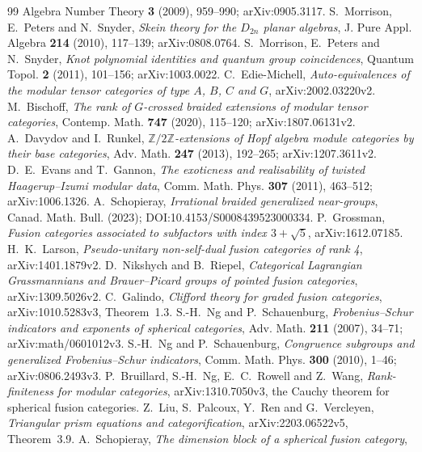\documentclass[11pt,reqno]{amsart}
\theoremstyle{definition}
\theoremstyle{remark}
\newcommand{\Z}{\mathbb Z}
\begin{document}
\begin{thebibliography}{99}
Algebra Number Theory \textbf{3} (2009), 959--990; arXiv:0905.3117.
 S.~Morrison, E.~Peters and N.~Snyder,
\emph{Skein theory for the $D_{2n}$ planar algebras},
J. Pure Appl. Algebra \textbf{214} (2010), 117--139; arXiv:0808.0764.
 S.~Morrison, E.~Peters and N.~Snyder,
\emph{Knot polynomial identities and quantum group coincidences},
Quantum Topol. \textbf{2} (2011), 101--156; arXiv:1003.0022.
 C.~Edie-Michell,
\emph{Auto-equivalences of the modular tensor categories of type
$A$, $B$, $C$ and $G$}, arXiv:2002.03220v2.
 M.~Bischoff,
\emph{The rank of $G$-crossed braided extensions of modular tensor
categories}, Contemp. Math. \textbf{747} (2020), 115--120;
arXiv:1807.06131v2.
 A.~Davydov and I.~Runkel,
\emph{$\Z/2\Z$-extensions of Hopf algebra module categories by their
base categories}, Adv. Math. \textbf{247} (2013), 192--265;
arXiv:1207.3611v2.
 D.~E.~Evans and T.~Gannon,
\emph{The exoticness and realisability of twisted Haagerup--Izumi
modular data}, Comm. Math. Phys. \textbf{307} (2011), 463--512;
arXiv:1006.1326.
 A.~Schopieray,
\emph{Irrational braided generalized near-groups},
Canad. Math. Bull. (2023); DOI:10.4153/S0008439523000334.
 P.~Grossman,
\emph{Fusion categories associated to subfactors with index
$3+\sqrt5$}, arXiv:1612.07185.
 H.~K.~Larson,
\emph{Pseudo-unitary non-self-dual fusion categories of rank 4},
arXiv:1401.1879v2.
 D.~Nikshych and B.~Riepel,
\emph{Categorical Lagrangian Grassmannians and Brauer--Picard groups
of pointed fusion categories}, arXiv:1309.5026v2.
 C.~Galindo,
\emph{Clifford theory for graded fusion categories},
arXiv:1010.5283v3, Theorem~1.3.
 S.-H.~Ng and P.~Schauenburg,
\emph{Frobenius--Schur indicators and exponents of spherical categories},
Adv. Math. \textbf{211} (2007), 34--71; arXiv:math/0601012v3.
 S.-H.~Ng and P.~Schauenburg,
\emph{Congruence subgroups and generalized Frobenius--Schur indicators},
Comm. Math. Phys. \textbf{300} (2010), 1--46; arXiv:0806.2493v3.
 P.~Bruillard, S.-H.~Ng, E.~C.~Rowell and Z.~Wang,
\emph{Rank-finiteness for modular categories}, arXiv:1310.7050v3,
the Cauchy theorem for spherical fusion categories.
 Z.~Liu, S.~Palcoux, Y.~Ren and G.~Vercleyen,
\emph{Triangular prism equations and categorification},
arXiv:2203.06522v5, Theorem~3.9.
A.~Schopieray, \emph{The dimension block of a spherical fusion category},

\end{thebibliography}
\end{document}
